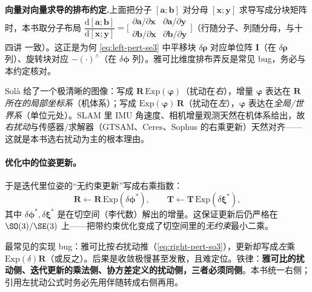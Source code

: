 \begin{note}
\textbf{向量对向量求导的排布约定.}\;上面把分子 $[\mathbf{a};\mathbf{b}]$ 对分母 $[\mathbf{x};\mathbf{y}]$ 求导写成分块矩阵时，本书取分子布局 $\dfrac{\mathrm{d}[\mathbf{a};\mathbf{b}]}{\mathrm{d}[\mathbf{x};\mathbf{y}]}=\big[\begin{smallmatrix}\partial\mathbf{a}/\partial\mathbf{x}&\partial\mathbf{a}/\partial\mathbf{y}\\\partial\mathbf{b}/\partial\mathbf{x}&\partial\mathbf{b}/\partial\mathbf{y}\end{smallmatrix}\big]$（行随分子、列随分母，与十四讲\cite{gaoxiang2019slam14} 一致）。这正是为何 \cref{eq:left-pert-se3} 中平移块 $\delta\boldsymbol{\rho}$ 对应单位阵 $\mathbf{I}$（在 $\delta\boldsymbol{\rho}$ 列）、旋转块对应 $-(\cdot)^\wedge$（在 $\delta\boldsymbol{\phi}$ 列）。雅可比维度排布弄反是常见 bug，务必与本约定核对。
\end{note}

\begin{insight}[为什么右扰动 = 在“机体/局部系”下扰动]
Solà\cite{sola2018micro} 给了一个极清晰的图像：写成 $\mathbf{R}\,\mathrm{Exp}(\boldsymbol{\varphi})$（扰动在\emph{右}），增量 $\boldsymbol{\varphi}$ 表达在 $\mathbf{R}$ \emph{所在的局部坐标系}（机体系）；写成 $\mathrm{Exp}(\boldsymbol{\varphi})\,\mathbf{R}$（扰动在\emph{左}），$\boldsymbol{\varphi}$ 表达在\emph{全局/世界系}（单位元处）。SLAM 里 IMU 角速度、相机增量观测天然在机体系给出，故\emph{右扰动}与传感器/求解器（GTSAM、Ceres、Sophus 的右乘更新）天然对齐——这就是本书选右扰动为主的根本理由。
\end{insight}

\paragraph{优化中的位姿更新。}于是迭代里位姿的“无约束更新”写成右乘指数：
\begin{equation}
  \mathbf{R}\leftarrow\mathbf{R}\,\mathrm{Exp}(\delta\boldsymbol{\phi}^*),\qquad
  \mathbf{T}\leftarrow\mathbf{T}\,\mathrm{Exp}(\delta\boldsymbol{\xi}^*),
  \label{eq:right-update}
\end{equation}
其中 $\delta\boldsymbol{\phi}^*,\delta\boldsymbol{\xi}^*$ 是在切空间（李代数）解出的增量。这保证更新后仍严格在 $\SO(3)/\SE(3)$ 上——把带约束优化变成了切空间里的\emph{无约束}最小二乘。

\begin{pitfall}
最常见的实现 bug：雅可比按\emph{右}扰动推（\cref{eq:right-pert-so3}），更新却写成\emph{左}乘 $\mathrm{Exp}(\delta)\mathbf{R}$（或反之）。后果是收敛极慢甚至发散，且难定位。铁律：\textbf{雅可比的扰动侧、迭代更新的乘法侧、协方差定义的扰动侧，三者必须同侧}。本书统一右侧；引用左扰动公式时务必先用伴随转成右侧再用。
\end{pitfall}

